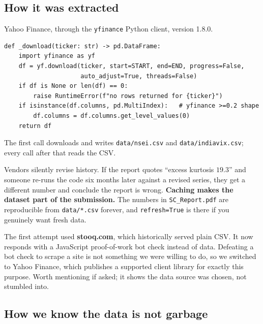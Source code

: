\documentclass[11pt,a4paper]{article}
\begin{document}
\subsection{How it was extracted}

Yahoo Finance, through the \texttt{yfinance} Python client, version 1.8.0.

\begin{lstlisting}[style=py]
def _download(ticker: str) -> pd.DataFrame:
    import yfinance as yf
    df = yf.download(ticker, start=START, end=END, progress=False,
                     auto_adjust=True, threads=False)
    if df is None or len(df) == 0:
        raise RuntimeError(f"no rows returned for {ticker}")
    if isinstance(df.columns, pd.MultiIndex):   # yfinance >=0.2 shape
        df.columns = df.columns.get_level_values(0)
    return df
\end{lstlisting}

The first call downloads and writes \texttt{data/nsei.csv} and \texttt{data/indiavix.csv};
every call after that reads the CSV.

\begin{keybox}
Vendors silently revise history. If the report quotes ``excess kurtosis $19.3$'' and someone
re-runs the code six months later against a revised series, they get a different number and
conclude the report is wrong. \textbf{Caching makes the dataset part of the submission.} The
numbers in \texttt{SC\_Report.pdf} are reproducible from \texttt{data/*.csv} forever, and
\texttt{refresh=True} is there if you genuinely want fresh data.
\end{keybox}

\begin{trapbox}
The first attempt used \textbf{stooq.com}, which historically served plain CSV. It now
responds with a JavaScript proof-of-work bot check instead of data. Defeating a bot check to
scrape a site is not something we were willing to do, so we switched to Yahoo Finance, which
publishes a supported client library for exactly this purpose. Worth mentioning if asked;
it shows the data source was chosen, not stumbled into.
\end{trapbox}

\subsection{How we know the data is not garbage}
\end{document}
